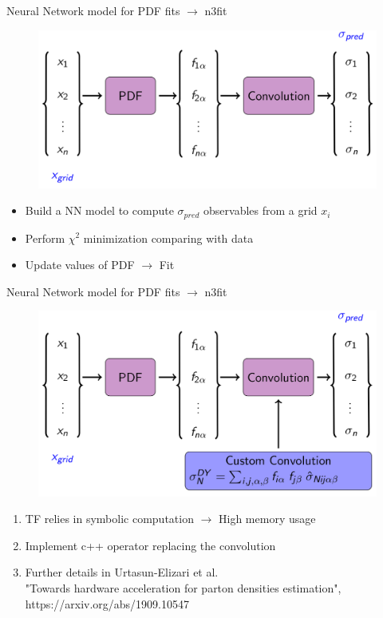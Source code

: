 \documentclass[aspectratio=43]{beamer}
\begin{document}
\begin{frame}

	\center \footnotesize Neural Network model for PDF fits $\longrightarrow$ {\color{violet}n3fit}
	
	\begin{figure}
		\includegraphics[width = 8.5 cm]{plots/section2/TF_convolution.png}
	\end{figure}


	\begin{itemize}
		\item \footnotesize Build a NN model to compute $\sigma_{pred}$ observables from a grid $x_{i}$
		\item \footnotesize Perform $\chi^{2}$ minimization comparing with data
		\item \footnotesize Update values of PDF $\longrightarrow$ {\color{violet} Fit}
	\end{itemize}

\end{frame}

\begin{frame}

	\center \footnotesize Neural Network model for PDF fits $\longrightarrow$ {\color{violet}n3fit}
		
	\begin{figure}
		\includegraphics[width = 8.5 cm]{plots/section2/TF_convolution2.png}
	\end{figure}

	\begin{enumerate}
		\item \footnotesize TF relies in symbolic computation $\longrightarrow$ High memory usage
		\item \footnotesize Implement c++ operator replacing the convolution
		\item Further details in Urtasun-Elizari et al.\\
		{\color{blue}"Towards hardware acceleration for parton densities estimation",\\ https://arxiv.org/abs/1909.10547}
	\end{enumerate}

\end{frame}
\end{document}
